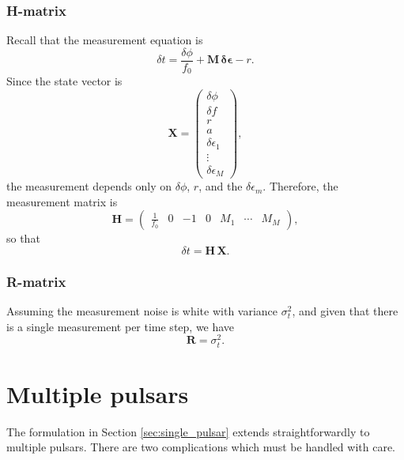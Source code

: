 \documentclass[]{scrartcl}
\begin{document}
\subsubsection{H-matrix}
	Recall that the measurement equation is
		\begin{equation}
	\delta t = \frac{\delta\phi}{f_0} + \boldsymbol{M}\,\boldsymbol{\delta\epsilon} - r.
		\end{equation}
	Since the state vector is
	\begin{equation}
	\boldsymbol{X} = \begin{pmatrix}
		\delta\phi \\ \delta f \\ r \\ a \\ \delta\epsilon_1 \\ \vdots \\ \delta\epsilon_M
	\end{pmatrix},
		\end{equation}
	the measurement depends only on $\delta\phi$, $r$, and the $\delta\epsilon_m$. Therefore, the measurement matrix is
		\begin{equation}
	\boldsymbol{H} = \begin{pmatrix}
		\frac{1}{f_0} & 0 & -1 & 0 & M_1 & \cdots & M_M
	\end{pmatrix},
		\end{equation}
	so that
		\begin{equation}
	\delta t = \boldsymbol{H}\,\boldsymbol{X}.
		\end{equation}
	
\subsubsection{R-matrix}
	Assuming the measurement noise is white with variance $\sigma_t^2$, and given that there is a single measurement per time step, we have
	\begin{equation}
	\boldsymbol{R} = \sigma_t^2.
	\end{equation}

	


\section{Multiple pulsars}

The formulation in Section \ref{sec:single_pulsar} extends straightforwardly to multiple pulsars. There are two complications which must be handled with care.
\end{document}
